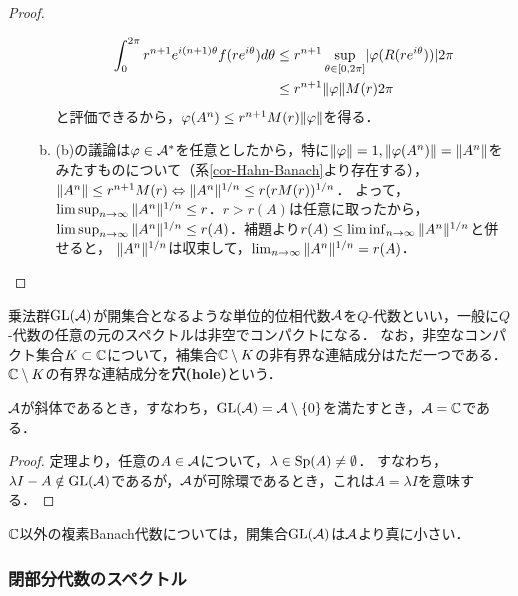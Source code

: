 \documentclass[uplatex,dvipdfmx]{jsreport}
\begin{document}
\begin{proof}
\begin{enumerate}
\begin{enumerate}[(a)]
\begin{align*}
                \int^{2\pi}_0r^{n+1}e^{i(n+1)\theta}f(re^{i\theta})d\theta&\le r^{n+1}\sup_{\theta\in[0,2\pi]}\lvert\varphi(R(re^{i\theta}))\rvert2\pi\\
                &\le r^{n+1}\|\varphi\|M(r)2\pi
            \end{align*}
            と評価できるから，$\varphi(A^n)\le r^{n+1}M(r)\|\varphi\|$を得る．
            \item (b)の議論は$\varphi\in\mathcal{A}^*$を任意としたから，特に$\|\varphi\|=1,\|\varphi(A^n)\|=\|A^n\|$をみたすものについて（系\ref{cor-Hahn-Banach}より存在する），
            $\|A^n\|\le r^{n+1}M(r)\Leftrightarrow\|A^n\|^{1/n}\le r(rM(r))^{1/n}$．
            よって，$\limsup_{n\to\infty}\|A^n\|^{1/n}\le r$．$r>r(A)$は任意に取ったから，
            $\limsup_{n\to\infty}\|A^n\|^{1/n}\le r(A)$．補題より$r(A)\le\liminf_{n\to\infty}\|A^n\|^{1/n}$と併せると，
            $\|A^n\|^{1/n}$は収束して，$\lim_{n\to\infty}\|A^n\|^{1/n}=r(A)$．
        \end{enumerate}
    \end{enumerate}
\end{proof}
\begin{remarks}
    乗法群$\mathrm{GL}(\mathcal{A})$が開集合となるような単位的位相代数$\mathcal{A}$を$Q$-代数といい，一般に$Q$-代数の任意の元のスペクトルは非空でコンパクトになる．
    なお，非空なコンパクト集合$K\subset\mathbb{C}$について，補集合$\mathbb{C}\setminus K$の非有界な連結成分はただ一つである．
    $\mathbb{C}\setminus K$の有界な連結成分を\textbf{穴(hole)}という．
\end{remarks}

\begin{corollary}\label{cor-Gelfand-Mazur-thm}
    $\mathcal{A}$が斜体であるとき，すなわち，$\mathrm{GL}(\mathcal{A})=\mathcal{A}\setminus\{0\}$を満たすとき，$\mathcal{A}=\mathbb{C}$である．
\end{corollary}
\begin{proof}
    定理より，任意の$A\in\mathcal{A}$について，$\lambda\in\mathrm{Sp}(A)\ne\emptyset$．
    すなわち，$\lambda I-A\notin\mathrm{GL}(\mathcal{A})$であるが，$\mathcal{A}$が可除環であるとき，これは$A=\lambda I$を意味する．
\end{proof}
\begin{remarks}
    $\mathbb{C}$以外の複素Banach代数については，開集合$\mathrm{GL}(\mathcal{A})$は$\mathcal{A}$より真に小さい．
\end{remarks}

\subsubsection{閉部分代数のスペクトル}
\end{document}
